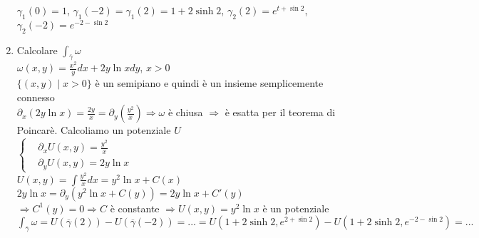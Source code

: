 \begin{exbar}
\begin{example}
\begin{enumerate}
		$\gamma_1(0)=1$, $\gamma_1(-2)=\gamma_1(2)=1+2\sinh 2$, $\gamma_2(2)=e^{t+\sin 2}$, $\gamma_2(-2)=e^{-2-\sin 2}$
		\item Calcolare $\int_{\overline{\gamma}}\omega $\\
		$\omega(x,y)=\frac{x^2}{y}dx+2y \ln x dy$, $x >0$\\
		$\{(x,y)\mid x>0\}$ è un semipiano e quindi è un insieme semplicemente connesso\\
		$\partial_x(2y\ln x)=\frac{2y}{x}=\partial_y (\frac{y^2}{x}) \Rightarrow \omega$ è chiusa $\Rightarrow$ è esatta per il teorema di Poincarè. Calcoliamo un potenziale $U$\\
		$\begin{cases}
			&\partial_x U (x,y)=\frac{y^2}{x}\\
			&\partial_yU(x,y)= 2y\ln x
		\end{cases}$\\
		$U(x,y)=\int \frac{y^2}{x}dx=y^2\ln x + C(x)$\\
		$2y\ln x = \partial_y(y^2\ln x + C(y))=2y\ln x + C'(y)$\\
		$\Rightarrow C^1 (y)=0 \Rightarrow C$ è constante $\Rightarrow U(x,y)=y^2\ln x$ è un potenziale\\
		$\int_{\overline{\gamma}}\omega =U(\overline{\gamma}(2))-U(\overline{\gamma}(-2))=...= U(1+2\sinh 2, e^{2+\sin 2})-U(1+2\sinh 2, e^{-2-\sin 2})=...$
	\end{enumerate}
\end{example}
\end{exbar}


